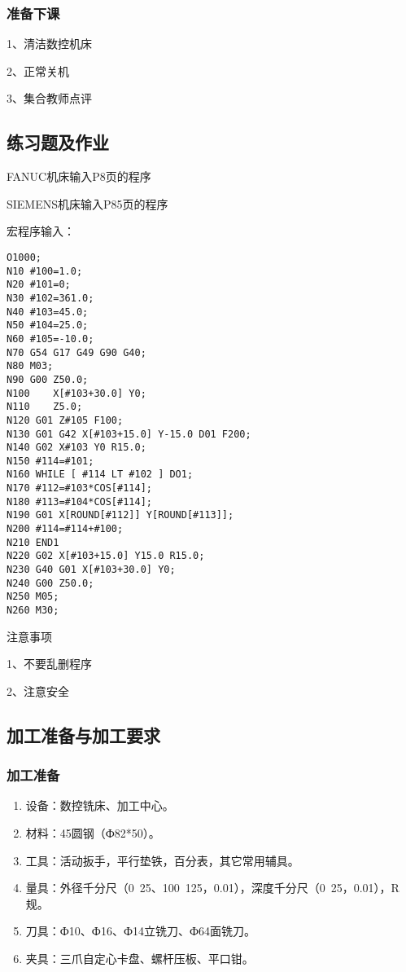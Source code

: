 \subsubsection{准备下课}
1、清洁数控机床

2、正常关机

3、集合教师点评

\subsection{练习题及作业}
FANUC机床输入P8页的程序

SIEMENS机床输入P85页的程序

宏程序输入：

\begin{lstlisting}
O1000;
N10 #100=1.0;
N20 #101=0;
N30 #102=361.0;
N40 #103=45.0;
N50 #104=25.0;
N60 #105=-10.0;
N70 G54 G17 G49 G90 G40;
N80 M03;
N90 G00 Z50.0;
N100    X[#103+30.0] Y0;
N110    Z5.0;
N120 G01 Z#105 F100;
N130 G01 G42 X[#103+15.0] Y-15.0 D01 F200;
N140 G02 X#103 Y0 R15.0;
N150 #114=#101;
N160 WHILE [ #114 LT #102 ] DO1;
N170 #112=#103*COS[#114];
N180 #113=#104*COS[#114];
N190 G01 X[ROUND[#112]] Y[ROUND[#113]];
N200 #114=#114+#100;
N210 END1
N220 G02 X[#103+15.0] Y15.0 R15.0;
N230 G40 G01 X[#103+30.0] Y0;
N240 G00 Z50.0;
N250 M05;
N260 M30;

\end{lstlisting}
注意事项

1、不要乱删程序

2、注意安全


\vfill
\subsection{加工准备与加工要求}
\subsubsection{加工准备}
\begin{enumerate}[1、]
\item 设备：数控铣床、加工中心。
\item 材料：45圆钢（Ф82*50）。
\item  工具：活动扳手，平行垫铁，百分表，其它常用辅具。
\item  
量具：外径千分尺（0~25、100~125，0.01），深度千分尺（0~25，0.01），R规。
\item  刀具：Ф10、Ф16、Ф14立铣刀、Ф64面铣刀。
\item  夹具：三爪自定心卡盘、螺杆压板、平口钳。
\end{enumerate}
